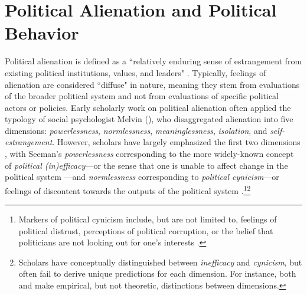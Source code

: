 \documentclass[12pt]{article}
\begin{document}
\section*{Political Alienation and Political Behavior}

Political alienation is defined as a ``relatively enduring sense of estrangement from existing political institutions, values, and leaders" \parencite[][3]{citrin1975personal}. Typically, feelings of alienation are considered ``diffuse" \parencite{easton1965systems} in nature, meaning they stem from evaluations of the broader political system and not from evaluations of specific political actors or policies. Early scholarly work on political alienation often applied the typology of social psychologist Melvin \citeauthor{seeman1959on} (\citeyear{seeman1959on,seeman1975alienation}), who disaggregated alienation into five dimensions: \textit{powerlessness}, \textit{normlessness}, \textit{meaninglessness}, \textit{isolation}, and \textit{self-estrangement}. However, scholars have largely emphasized the first two dimensions \parencite[e.g.,][]{olsen1969two,finifter1970dimensions}, with Seeman's \textit{powerlessness} corresponding to the more widely-known concept of \textit{political (in)efficacy}---or the sense that one is unable to affect change in the political system \parencite{campbell1954voter}---and \textit{normlessness} corresponding to \textit{political cynicism}---or feelings of discontent towards the outputs of the political system \parencite{gamson1968power,miller1974political}.\footnote{Markers of political cynicism include, but are not limited to, feelings of political distrust, perceptions of political corruption, or the belief that politicians are not looking out for one's interests \parencite{miller1974political,dyck2018primary}.}\footnote{Scholars have conceptually distinguished between \textit{inefficacy} and \textit{cynicism}, but often fail to derive unique predictions for each dimension. For instance, both \textcite{citrin1975personal} and \textcite{southwell1998electoral} make empirical, but not theoretic, distinctions between dimensions.}
\end{document}
